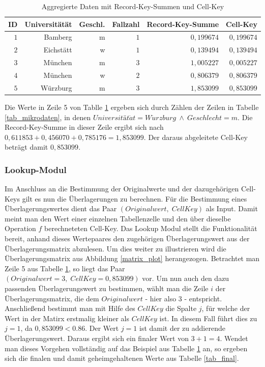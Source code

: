 \begin{table}[h]
    \centering
    \begin{tabular}{ r r r r r r}
        \textbf{ID} \vline & \textbf{Universitätät} & \textbf{Geschl.} & \textbf{Fallzahl} & \textbf{Record-Key-Summe} & \textbf{Cell-Key} \\ 
        \hline
        $1$ \vline & Bamberg & m & $1$ & $0,199674$ & $0,199674$ \\
        $2$ \vline & Eichstätt & w & $1$ & $0,139494$ & $0,139494$ \\
        $3$ \vline & München & m & $3$ & $1,005227$ & $0,005227$ \\
        $4$ \vline & München & w & $2$ & $0,806379$ & $0,806379$ \\
        $5$ \vline & Würzburg & m & $3$ & $1,853099$ & $0,853099$
    \end{tabular}
    \caption{Aggregierte Daten mit Record-Key-Summen und Cell-Key}
    \label{tab_agg}
\end{table}

Die Werte in Zeile 5 von Tablle \ref{tab_agg} ergeben sich durch Zählen der Zeilen in Tabelle \ref{tab_mikrodaten}, in denen $Universität\ddot{a}t = W\ddot{u}rzburg \: \wedge \: Geschlecht = m$. Die Record-Key-Summe in dieser Zeile ergibt sich nach $0,611853 + 0,456070 + 0,785176 = 1,853099$. Der daraus abgeleitete Cell-Key beträgt damit $0,853099$.

\subsubsection{Lookup-Modul}

Im Anschluss an die Bestimmung der Originalwerte und der dazugehörigen Cell-Keys gilt es nun die Überlagerungen zu berechnen. Für die Bestimmung eines Überlagerungswertes dient das Paar $(Originalwert, \; CellKey)$ als Input. Damit meint man den Wert einer einzelnen Tabellenzelle und den über dieselbe Operation $f$ berechneteten Cell-Key. Das Lookup Modul stellt die Funktionalität bereit, anhand dieses Wertepaares den zugehörigen Überlagerungswert aus der Überlagerungsmatrix abzulesen. Um dies weiter zu illustrieren wird die Überlagerungsmatrix aus Abbildung \ref{matrix_plot} herangezogen. Betrachtet man Zeile 5 aus Tabelle \ref{tab_agg}, so liegt das Paar $(Originalwert = 3, \; CellKey = 0,853099)$ vor. Um nun auch den dazu passenden Überlagerungswert zu bestimmen, wählt man die Zeile $i$ der Überlagerungsmatrix, die dem $Originalwert$ - hier also $3$ - entspricht. Anschlie\ss end bestimmt man mit Hilfe des $CellKey$ die Spalte $j$, für welche der Wert in der Matirx erstmalig kleiner als $CellKey$ ist. In diesem Fall führt dies zu $j = 1$, da $0,853099 < 0.86$. Der Wert $j = 1$ ist damit der zu addierende Überlagerungswert. Daraus ergibt sich ein finaler Wert von $3 + 1 = 4$. Wendet man dieses Vorgehen vollständig auf das Beispiel aus Tabelle \ref{tab_agg} an, so ergeben sich die finalen und damit geheimgehaltenen Werte aus Tabelle \ref{tab_final}.

